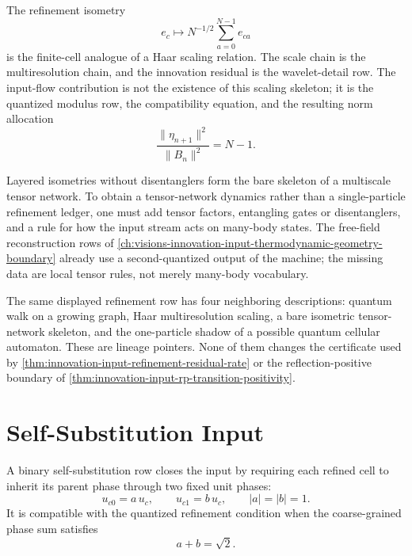 \begin{principle}
\label{prin:innovation-input-multiresolution-skeleton}
The refinement isometry
$$
e_c\longmapsto N^{-1/2}\sum_{a=0}^{N-1}e_{ca}
$$
is the finite-cell analogue of a Haar scaling relation. The scale chain is
the multiresolution chain, and the innovation residual is the wavelet-detail
row. The input-flow contribution is not the existence of this scaling
skeleton; it is the quantized modulus row, the compatibility equation, and
the resulting norm allocation
$$
\frac{\|\eta_{n+1}\|^2}{\|B_n\|^2}=N-1.
$$
\end{principle}

\begin{principle}
\label{prin:innovation-input-tensor-network-interface}
Layered isometries without disentanglers form the bare skeleton of a
multiscale tensor network. To obtain a tensor-network dynamics rather than
a single-particle refinement ledger, one must add tensor factors,
entangling gates or disentanglers, and a rule for how the input stream acts
on many-body states. The free-field reconstruction rows of
\autoref{ch:visions-innovation-input-thermodynamic-geometry-boundary}
already use a second-quantized output of the machine; the missing data are
local tensor rules, not merely many-body vocabulary.
\end{principle}

\begin{principle}
\label{prin:innovation-input-lineage-ledger}
The same displayed refinement row has four neighboring descriptions:
quantum walk on a growing graph, Haar multiresolution scaling, a bare
isometric tensor-network skeleton, and the one-particle shadow of a
possible quantum cellular automaton. These are lineage pointers. None of
them changes the certificate used by
\autoref{thm:innovation-input-refinement-residual-rate} or the
reflection-positive boundary of
\autoref{thm:innovation-input-rp-transition-positivity}.
\end{principle}

\section{Self-Substitution Input}
\label{sec:innovation-input-self-substitution}

\begin{definition}
\label{def:innovation-input-binary-self-substitution}
A binary self-substitution row closes the input by requiring each refined
cell to inherit its parent phase through two fixed unit phases:
$$
u_{c0}=a\,u_c,
\qquad
u_{c1}=b\,u_c,
\qquad
|a|=|b|=1.
$$
It is compatible with the quantized refinement condition when the
coarse-grained phase sum satisfies
$$
a+b=\sqrt2.
$$
\end{definition}

